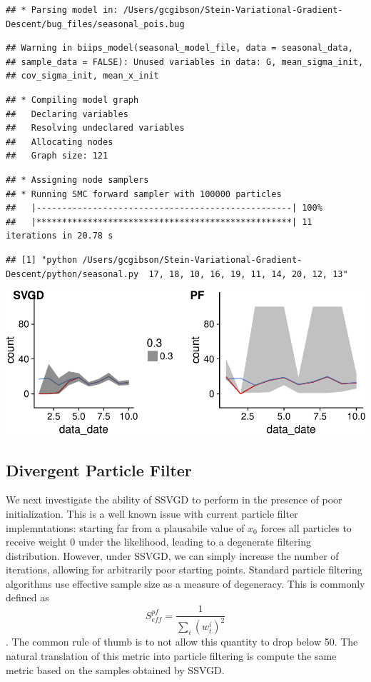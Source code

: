 \documentclass[]{article}
\begin{document}
\begin{verbatim}
## * Parsing model in: /Users/gcgibson/Stein-Variational-Gradient-Descent/bug_files/seasonal_pois.bug
\end{verbatim}

\begin{verbatim}
## Warning in biips_model(seasonal_model_file, data = seasonal_data,
## sample_data = FALSE): Unused variables in data: G, mean_sigma_init,
## cov_sigma_init, mean_x_init
\end{verbatim}

\begin{verbatim}
## * Compiling model graph
##   Declaring variables
##   Resolving undeclared variables
##   Allocating nodes
##   Graph size: 121
\end{verbatim}

\begin{verbatim}
## * Assigning node samplers
## * Running SMC forward sampler with 100000 particles
##   |--------------------------------------------------| 100%
##   |**************************************************| 11 iterations in 20.78 s
\end{verbatim}

\begin{verbatim}
## [1] "python /Users/gcgibson/Stein-Variational-Gradient-Descent/python/seasonal.py  17, 18, 10, 16, 19, 11, 14, 20, 12, 13"
\end{verbatim}

\includegraphics{ssvgd_files/figure-latex/unnamed-chunk-3-1.pdf}

\subsection{Divergent Particle Filter}\label{divergent-particle-filter}

We next investigate the ability of SSVGD to perform in the presence of
poor initialization. This is a well known issue with current particle
filter implemntations: starting far from a plausabile value of \(x_0\)
forces all particles to receive weight \(0\) under the likelihood,
leading to a degenerate filtering distribution. However, under SSVGD, we
can simply increase the number of iterations, allowing for arbitrarily
poor starting points. Standard particle filtering algorithms use
effective sample size as a measure of degeneracy. This is commonly
defined as \[S^{pf}_{eff} = \frac{1}{\sum_i (w_t^i)^2}\]. The common
rule of thumb is to not allow this quantity to drop below 50. The
natural translation of this metric into particle filtering is compute
the same metric based on the samples obtained by SSVGD.
\end{document}
